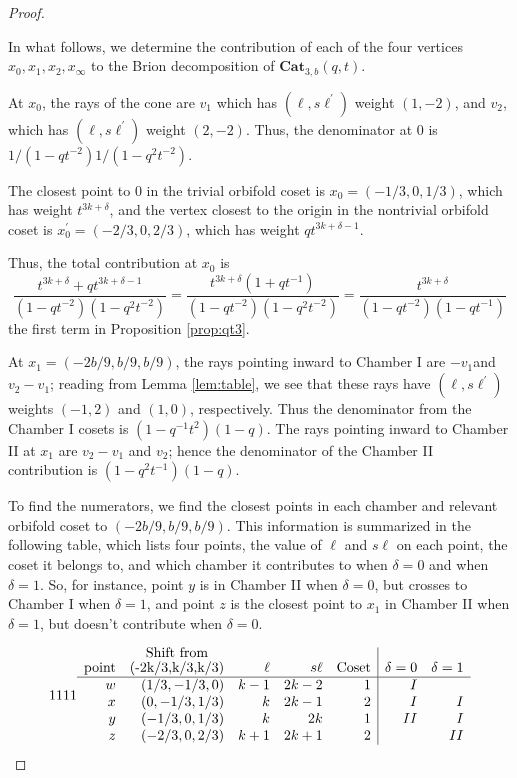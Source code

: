 \documentclass{amsart}[12pt]
\theoremstyle{definition}
\newcommand{\Cat}{\mathbf{Cat}}
\newcommand{\sk}{s\ell}
\begin{document}
\begin{proof}
\begin{center}
\begin{tikzpicture}
  \end{tikzpicture}




\end{center}


In what follows, we determine the contribution of each of the four vertices $x_0,x_1,x_2,x_\infty$ to the Brion decomposition of $\Cat_{3,b}(q,t)$.



At $x_0$, the rays of the cone are $v_1$ which has $(\ell, \sk^\prime)$ weight $(1, -2)$, and $v_2$, which has $(\ell, \sk^\prime)$ weight $(2,-2)$.  Thus, the denominator at $0$ is $1/(1-qt^{-2})1/(1-q^2t^{-2})$.

The closest point to $0$ in the trivial orbifold coset is $x_0=(-1/3,0,1/3)$, which has weight $t^{3k+\delta}$, and the vertex closest to the origin in the nontrivial orbifold coset is $x_0^\prime=(-2/3,0,2/3)$, which has weight $qt^{3k+\delta-1}$.

Thus, the total contribution at $x_0$ is
$$\frac{t^{3k+\delta}+qt^{3k+\delta-1}}{(1-qt^{-2})(1-q^2t^{-2})}=\frac{t^{3k+\delta}(1+qt^{-1})}{(1-qt^{-2})(1-q^2t^{-2})}
=\frac{t^{3k+\delta}}{(1-qt^{-2})(1-qt^{-1})}$$
the first term in Proposition \ref{prop:qt3}.

At $x_1=(-2b/9, b/9, b/9)$, the rays pointing inward to Chamber I are $-v_1$and $v_2-v_1$; reading from Lemma \ref{lem:table}, we see that these rays have $(\ell, \sk^\prime)$ weights $(-1, 2)$ and $(1, 0)$, respectively.  Thus the denominator from the Chamber I cosets is $(1-q^{-1}t^2)(1-q)$.  The rays pointing inward to Chamber II at $x_1$ are $v_2-v_1$ and $v_2$; hence the denominator of the Chamber II contribution is $(1-q^2t^{-1})(1-q)$.

To find the numerators, we find the closest points in each chamber and relevant orbifold coset to $(-2b/9, b/9, b/9)$.  This information is summarized in the following table, which lists four points, the value of $\ell$ and $\sk$ on each point, the coset it belongs to, and which chamber it contributes to when $\delta=0$ and when $\delta=1$.  So, for instance, point $y$ is in Chamber II when $\delta=0$, but crosses to Chamber I when $\delta=1$, and point $z$ is the closest point to $x_1$ in Chamber II when $\delta=1$, but doesn't contribute when $\delta=0$.

$$1111
\begin{array}{rrrrr|rr}
\text{point} & \shortstack{ \text{Shift from}\\ (-2k/3,k/3,k/3)} & \ell & \sk & \text{Coset} & \delta=0  &\delta=1  \\
\hline
w  & (1/3, -1/3, 0) & k-1 & 2k-2 & 1 & I & \\
x  & (0, -1/3, 1/3) & k &2k-1 & 2 & I & I \\ 
y & (-1/3, 0, 1/3) & k &2k & 1 & II & I \\
z & (-2/3, 0, 2/3) & k+1 & 2k+1 & 2 &   & II 
\end{array}
$$


\end{proof}
\end{document}
